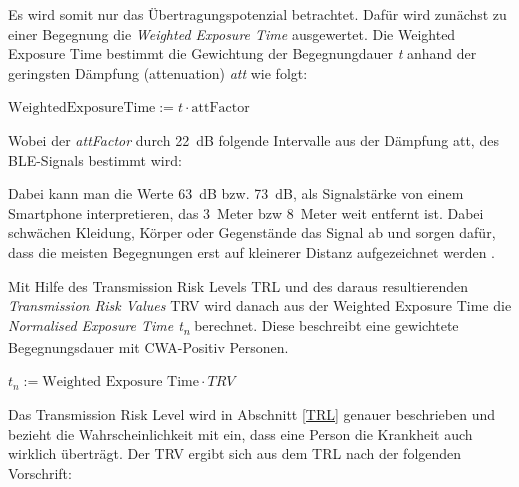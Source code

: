 \documentclass[conference,compsoc]{IEEEtran}
\begin{document}
Es wird somit nur das Übertragungspotenzial betrachtet. 
Dafür wird zunächst zu einer Begegnung die \textit{Weighted Exposure Time} ausgewertet. 
Die Weighted Exposure Time bestimmt die Gewichtung der Begegnungdauer \textit{t} anhand der geringsten Dämpfung (attenuation) \textit{att}  wie folgt: 

\centerline{\text{ }}
\centerline{$\text{WeightedExposureTime} := t \cdot \text{attFactor}$}
\centerline{\text{ }}

Wobei der \textit{attFactor} durch \SI{22}{dB} folgende Intervalle aus der Dämpfung att, des BLE-Signals bestimmt wird:

\centerline{\text{ }}




\centerline{\text{ }}

Dabei kann man die Werte \SI{63}{dB} bzw. \SI{73}{dB}, als Signalstärke von einem Smartphone interpretieren, das \SI{3}{Meter} bzw \SI{8}{Meter} weit entfernt ist. 
Dabei schwächen Kleidung, Körper oder Gegenstände das Signal ab und sorgen dafür, dass die meisten Begegnungen erst auf kleinerer Distanz aufgezeichnet werden \cite{RiskAssessment}.

Mit Hilfe des Transmission Risk Levels TRL und des daraus resultierenden \textit{Transmission Risk Values} TRV wird danach 
aus der Weighted Exposure Time die \textit{Normalised Exposure Time t\textsubscript{­n}} berechnet. 
Diese beschreibt eine gewichtete Begegnungsdauer mit CWA-Positiv Personen.

\centerline{\text{ }}
\centerline{$t_n := \text{Weighted Exposure Time}\cdot TRV$}
\centerline{\text{ }}

Das Transmission Risk Level wird in Abschnitt \ref{TRL} genauer beschrieben und 
bezieht die Wahrscheinlichkeit mit ein, dass eine Person die Krankheit auch wirklich überträgt. 
Der TRV ergibt sich aus dem TRL nach der folgenden Vorschrift:

\centerline{\text{ }}




\end{document}
